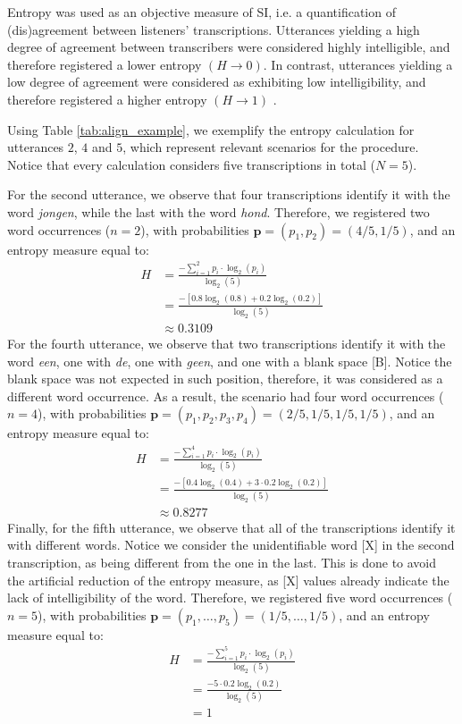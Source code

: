 Entropy was used as an objective measure of SI, i.e. a quantification of (dis)agreement between listeners' transcriptions. Utterances yielding a high degree of agreement between transcribers were considered highly intelligible, and therefore registered a lower entropy $\left( H \rightarrow 0 \right)$. In contrast, utterances yielding a low degree of agreement were considered as exhibiting low intelligibility, and therefore registered a higher entropy $\left( H \rightarrow 1 \right)$ \citep{Boonen_et_al_2021, Faes_et_al_2021}. 

Using Table \ref{tab:align_example}, we exemplify the entropy calculation for utterances $2$, $4$ and $5$, which represent relevant scenarios for the procedure. Notice that every calculation considers five transcriptions in total ($N=5$). 

For the second utterance, we observe that four transcriptions identify it with the word \textit{jongen}, while the last with the word \textit{hond}. Therefore, we registered two word occurrences ($n=2$), with probabilities $\pmb{p} = (p_{1}, p_{2}) = (4/5, 1/5)$, and an entropy measure equal to:
%
\begin{align*}
	H &= \frac{-\sum_{i=1}^{2} p_{i} \cdot \log_{2}(p_{i})}{\log_{2}(5)} \\
	&= \frac{- \left[ 0.8 \log_{2}(0.8) + 0.2 \log_{2}(0.2) \right] }{\log_{2}(5)} \\
	&\approx 0.3109
\end{align*} 
%
For the fourth utterance, we observe that two transcriptions identify it with the word \textit{een}, one with \textit{de}, one with \textit{geen}, and one with a blank space [B]. Notice the blank space was not expected in such position, therefore, it was considered as a different word occurrence. As a result, the scenario had four word occurrences ($n=4$), with probabilities $\pmb{p} = (p_{1}, p_{2}, p_{3}, p_{4}) = (2/5, 1/5, 1/5, 1/5)$, and an entropy measure equal to:
%
\begin{align*}
	H &= \frac{-\sum_{i=1}^{4} p_{i} \cdot \log_{2}(p_{i})}{\log_{2}(5)} \\
	&= \frac{- \left[ 0.4 \log_{2}(0.4) + 3 \cdot 0.2 \log_{2}(0.2) \right] }{\log_{2}(5)} \\
	&\approx 0.8277
\end{align*} 
%
Finally, for the fifth utterance, we observe that all of the  transcriptions identify it with different words. Notice we consider the unidentifiable word [X] in the second transcription, as being different from the one in the last. This is done to avoid the artificial reduction of the entropy measure, as [X] values already indicate the lack of intelligibility of the word. Therefore, we registered five word occurrences ($n=5$), with probabilities $\pmb{p} = (p_{1}, \dots, p_{5}) = (1/5, \dots, 1/5)$, and an entropy measure equal to:
%
\begin{align*}
	H &= \frac{-\sum_{i=1}^{5} p_{i} \cdot \log_{2}(p_{i})}{\log_{2}(5)} \\
	&= \frac{- 5 \cdot 0.2 \log_{2}(0.2) }{\log_{2}(5)} \\
	&= 1
\end{align*} 
%
%
